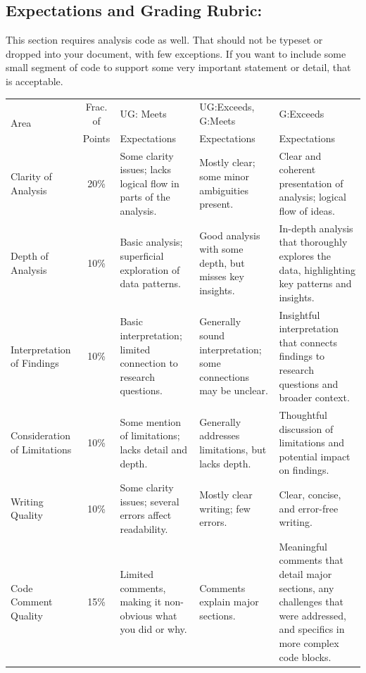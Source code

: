 \documentclass[11pt]{article}
\begin{document}
\subsection*{Expectations and Grading Rubric:}
This section requires analysis code as well.  That should not be typeset or dropped into your document, with few exceptions.  If you want to include some small segment of code to support some very important statement or detail, that is acceptable.

\begin{landscape}
\begin{table}
    \centering
    \small
    \begin{tabular}{p{.75in} c  p{2.25in}  p{2.25in}  p{2.25in}}
        \multirow{2}{*}{Area}  	& Frac. of   	& UG: Meets		& UG:Exceeds, G:Meets   & G:Exceeds 	  \\
                           			    & Points & Expectations  & Expectations  		& Expectations \\
        \toprule
        Clarity of Analysis     & 20\%\vspace{.25in} 				& Some clarity issues; lacks logical flow in parts of the analysis. & Mostly clear; some minor ambiguities present. & Clear and coherent presentation of analysis; logical flow of ideas. \\
        \midrule
        Depth of Analysis       & 10\%\vspace{.25in}				& Basic analysis; superficial exploration of data patterns. & Good analysis with some depth, but misses key insights. & In-depth analysis that thoroughly explores the data, highlighting key patterns and insights. \\
        \midrule
        Interpretation of Findings & 10\%\vspace{.25in}				& Basic interpretation; limited connection to research questions. & Generally sound interpretation; some connections may be unclear. & Insightful interpretation that connects findings to research questions and broader context. \\
        \midrule
        Consideration of Limitations & 10\%\vspace{.25in}				& Some mention of limitations; lacks detail and depth. & Generally addresses limitations, but lacks depth. & Thoughtful discussion of limitations and potential impact on findings. \\
        \midrule
        Writing Quality 		& 10\%\vspace{.25in}				& Some clarity issues; several errors affect readability. & Mostly clear writing; few errors. & Clear, concise, and error-free writing. \\
        \midrule
        Code Comment Quality    & 15\%\vspace{.25in}				& Limited comments, making it non-obvious what you did or why. & Comments explain major sections. & Meaningful comments that detail major sections, any challenges that were addressed, and specifics in more complex code blocks. \\
        \bottomrule
    \end{tabular}
\end{table}
\end{landscape}
\end{document}
